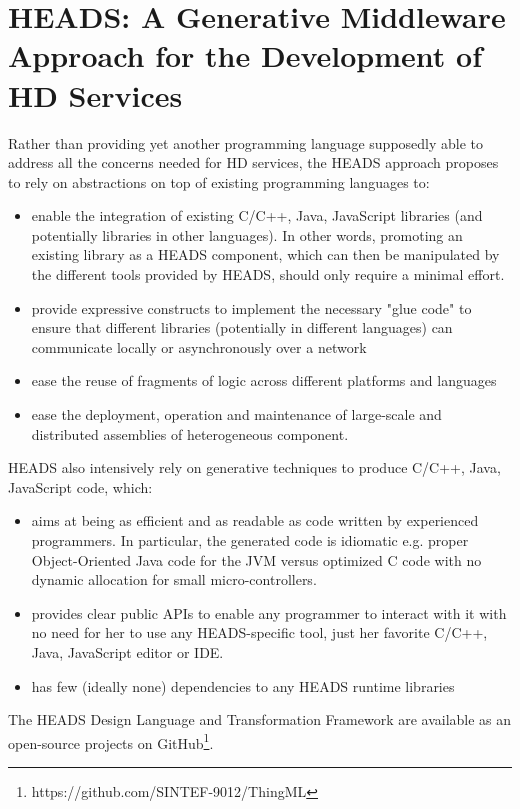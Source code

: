 \section{HEADS: A Generative Middleware Approach for the Development of HD Services}

Rather than providing yet another programming language supposedly able to address all the concerns needed for HD services, the HEADS approach proposes to rely on abstractions on top of existing programming languages to: 
\begin{itemize}
\item enable the integration of existing C/C++, Java, JavaScript libraries (and potentially libraries in other languages). In other words, promoting an existing library as a HEADS component, which can then be manipulated by the different tools provided by HEADS, should only require a minimal effort. 
\item provide expressive constructs to implement the necessary "glue code" to ensure that different libraries (potentially in different languages) can communicate locally or asynchronously over a network 
\item ease the reuse of fragments of logic across different platforms and languages 
\item ease the deployment, operation and maintenance of large-scale and distributed assemblies of heterogeneous component.
\end{itemize}

HEADS also intensively rely on generative techniques to produce C/C++, Java, JavaScript code, which: 
\begin{itemize}
	\item aims at being as efficient and as readable as code written by experienced programmers. In particular, the generated code is idiomatic e.g. proper Object-Oriented Java code for the JVM versus optimized C code with no dynamic allocation for small micro-controllers. 
\item provides clear public APIs to enable any programmer to interact with it with no need for her to use any HEADS-specific tool, just her favorite C/C++, Java, JavaScript editor or IDE. 
\item has few (ideally none) dependencies to any HEADS runtime libraries
\end{itemize}

The HEADS Design Language and Transformation Framework are available as an open-source projects on GitHub\footnote{https://github.com/SINTEF-9012/ThingML}.

